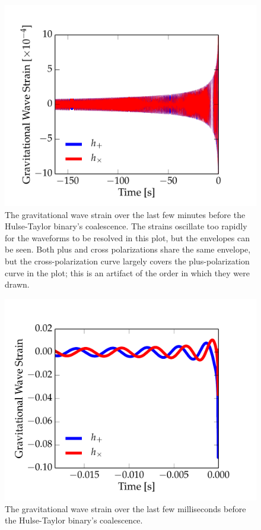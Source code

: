 \documentclass[preprint2]{aastex}
\begin{document}
\begin{figure}[t!]
\vspace{-0.24cm}
\centering
\hspace*{-1cm}\includegraphics[width=1.2\textwidth]{inspiral_figs/inspiral_strains1.pdf}
\caption{The gravitational wave strain over the last few minutes before the Hulse-Taylor binary's coalescence. The strains oscillate too rapidly for the waveforms to be resolved in this plot, but the envelopes can be seen. Both plus and cross polarizations share the same envelope, but the cross-polarization curve largely covers the plus-polarization curve in the plot; this is an artifact of the order in which they were drawn.}
\label{inspiral-strains1}
\end{figure}

\begin{figure}[t!]
\vspace{-0.24cm}
\centering
\hspace*{-1cm}\includegraphics[width=1.2\textwidth]{inspiral_figs/inspiral_strains2.pdf}
\caption{The gravitational wave strain over the last few milliseconds before the Hulse-Taylor binary's coalescence.}
\label{inspiral-strains2}
\end{figure}
\end{document}
